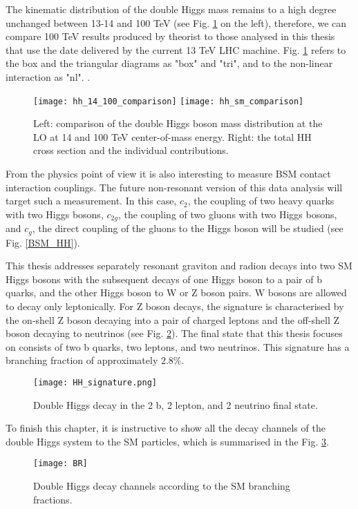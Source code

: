 The kinematic distribution of the double Higgs mass remains to a high degree unchanged between 13-14 and 100 TeV (see Fig. \ref{hh_comparison} on the left), therefore, we can compare 100 TeV results produced by theorist to those analysed in this thesis that use the date delivered by the current 13 TeV LHC machine. Fig. \ref{hh_comparison} refers to the box and the triangular diagrams as "box" and "tri", and to the non-linear interaction as "nl".  \cite{Contino:2012xk}. 



 
 

\begin{figure}[H]
  \centering 
    \texttt{[image: hh\_14\_100\_comparison]}
    \texttt{[image: hh\_sm\_comparison]}
    \caption{Left: comparison of the double Higgs boson mass distribution at the LO at 14 and 100 TeV center-of-mass energy. Right: the total HH cross section and the individual contributions.}
    \label{hh_comparison}
\end{figure}


From the physics point of view it is also interesting to measure BSM contact interaction couplings. The future non-resonant version of this data analysis will target such a measurement. In this case, $c_2$, the coupling of two heavy quarks with two Higgs bosons, $c_{2g}$, the coupling of two gluons with two Higgs bosons, and $c_g$, the direct coupling of the gluons to the Higgs boson will be studied (see Fig. \ref{BSM_HH}). 



This thesis addresses separately resonant graviton and radion decays into two SM Higgs bosons with the subsequent decays of one Higgs boson to a pair of b quarks, and the other Higgs boson to W or Z boson pairs. W bosons are allowed to decay only leptonically. For Z boson decays, the signature is characterised by the on-shell Z boson decaying into a pair of charged leptons and the off-shell Z boson decaying to neutrinos (see Fig. \ref{HH_signature}). The final state that this thesis focuses on consists of two b quarks, two leptons, and two neutrinos. This signature has a branching fraction of approximately $2.8 \%$. 

\begin{figure}[H]
  \centering
    \texttt{[image: HH\_signature.png]}
    \caption{Double Higgs decay in the 2 b, 2 lepton, and 2 neutrino final state. }
    \label{HH_signature}
\end{figure}

To finish this chapter, it is instructive to show all the decay channels of the double Higgs system to the SM particles, which is summarised in the Fig. \ref{BR}. 

\begin{figure}[H]
  \centering
    \texttt{[image: BR]}
    \caption{Double Higgs decay channels according to the SM branching fractions.}
    \label{BR}
\end{figure}



